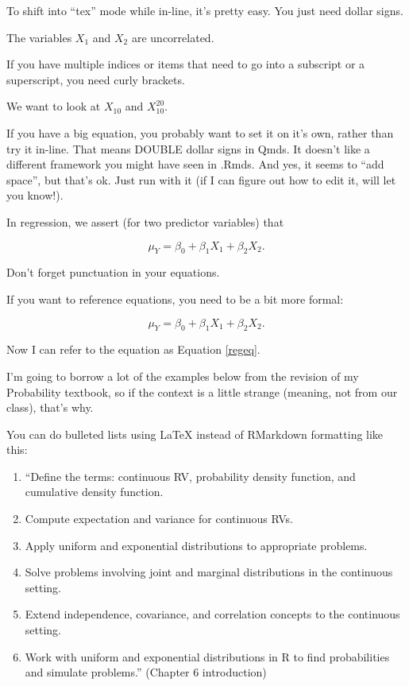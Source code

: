 \documentclass[
  12pt]{article}
\begin{document}
To shift into ``tex'' mode while in-line, it's pretty easy. You just
need dollar signs.

The variables \(X_1\) and \(X_2\) are uncorrelated.

If you have multiple indices or items that need to go into a subscript
or a superscript, you need curly brackets.

We want to look at \(X_{10}\) and \(X_{10}^{20}\).

If you have a big equation, you probably want to set it on it's own,
rather than try it in-line. That means DOUBLE dollar signs in Qmds. It
doesn't like a different framework you might have seen in .Rmds. And
yes, it seems to ``add space'', but that's ok. Just run with it (if I
can figure out how to edit it, will let you know!).

In regression, we assert (for two predictor variables) that

\[
\mu_Y = \beta_0 + \beta_1X_1 + \beta_2X_2.
\]

Don't forget punctuation in your equations.

If you want to reference equations, you need to be a bit more formal:

\begin{equation}
\label{regeq}
\mu_Y = \beta_0 + \beta_1X_1 + \beta_2X_2.
\end{equation}

Now I can refer to the equation as Equation \ref{regeq}.

I'm going to borrow a lot of the examples below from the revision of my
Probability textbook, so if the context is a little strange (meaning,
not from our class), that's why.

You can do bulleted lists using LaTeX instead of RMarkdown formatting
like this:

\begin{enumerate}
\item ``Define the terms: continuous RV, probability density function, and cumulative density function.
\item Compute expectation and variance for continuous RVs.
\item Apply uniform and exponential distributions to appropriate problems.
\item Solve problems involving joint and marginal distributions in the continuous setting.
\item Extend independence, covariance, and correlation concepts to the continuous setting.
\item Work with uniform and exponential distributions in R to find probabilities and simulate problems.'' (Chapter 6 introduction)
\end{enumerate}
\end{document}
